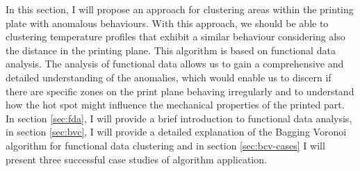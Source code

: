 In this section, I will propose an approach for clustering areas within the printing plate with anomalous behaviours. With this approach, we should be able to clustering temperature profiles that exhibit a similar behaviour considering also the distance in the printing plane. This algorithm is based on functional data analysis. The analysis of functional data allows us to gain a comprehensive and detailed understanding of the anomalies, which would enable us to discern if there are specific zones on the print plane behaving irregularly and to understand how the hot spot might influence the mechanical properties of the printed part. In section \ref{sec:fda}, I will provide a brief introduction to functional data analysis, in section \ref{sec:bvc}, I will provide a detailed explanation of the Bagging Voronoi algorithm for functional data clustering and in section \ref{sec:bcv-cases} I will present three successful case studies of algorithm application.

